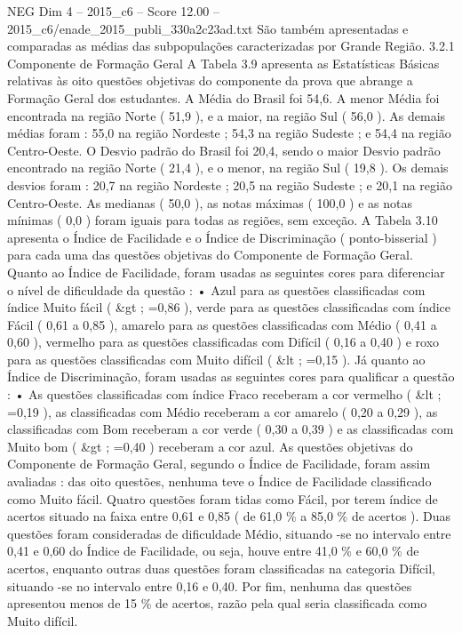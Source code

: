 \begin{textsample}{NEG Dim 4 – 2015\_c6 – Score 12.00 – 2015\_c6/enade\_2015\_publi\_330a2c23ad.txt}
São também apresentadas e comparadas as médias das subpopulações caracterizadas por Grande Região. 3.2.1 Componente de Formação Geral A Tabela 3.9 apresenta as Estatísticas Básicas relativas às oito questões objetivas do componente da prova que abrange a Formação Geral dos estudantes.
A Média do Brasil foi 54,6.
A menor Média foi encontrada na região Norte ( 51,9 ), e a maior, na região Sul ( 56,0 ).
As demais médias foram : 55,0 na região Nordeste ; 54,3 na região Sudeste ; e 54,4 na região Centro-Oeste.
O Desvio padrão do Brasil foi 20,4, sendo o maior Desvio padrão encontrado na região Norte ( 21,4 ), e o menor, na região Sul ( 19,8 ).
Os demais desvios foram : 20,7 na região Nordeste ; 20,5 na região Sudeste ; e 20,1 na região Centro-Oeste.
As medianas ( 50,0 ), as notas máximas ( 100,0 ) e as notas mínimas ( 0,0 ) foram iguais para todas as regiões, sem exceção.
A Tabela 3.10 apresenta o Índice de Facilidade e o Índice de Discriminação ( ponto-bisserial ) para cada uma das questões objetivas do Componente de Formação Geral.
Quanto ao Índice de Facilidade, foram usadas as seguintes cores para diferenciar o nível de dificuldade da questão : • Azul para as questões classificadas com índice Muito fácil ( \&gt ; =0,86 ), verde para as questões classificadas com índice Fácil ( 0,61 a 0,85 ), amarelo para as questões classificadas com Médio ( 0,41 a 0,60 ), vermelho para as questões classificadas com Difícil ( 0,16 a 0,40 ) e roxo para as questões classificadas com Muito difícil ( \&lt ; =0,15 ).
Já quanto ao Índice de Discriminação, foram usadas as seguintes cores para qualificar a questão : • As questões classificadas com índice Fraco receberam a cor vermelho ( \&lt ; =0,19 ), as classificadas com Médio receberam a cor amarelo ( 0,20 a 0,29 ), as classificadas com Bom receberam a cor verde ( 0,30 a 0,39 ) e as classificadas com Muito bom ( \&gt ; =0,40 ) receberam a cor azul.
As questões objetivas do Componente de Formação Geral, segundo o Índice de Facilidade, foram assim avaliadas : das oito questões, nenhuma teve o Índice de Facilidade classificado como Muito fácil.
Quatro questões foram tidas como Fácil, por terem índice de acertos situado na faixa entre 0,61 e 0,85 ( de 61,0 \% a 85,0 \% de acertos ).
Duas questões foram consideradas de dificuldade Médio, situando -se no intervalo entre 0,41 e 0,60 do Índice de Facilidade, ou seja, houve entre 41,0 \% e 60,0 \% de acertos, enquanto outras duas questões foram classificadas na categoria Difícil, situando -se no intervalo entre 0,16 e 0,40.
Por fim, nenhuma das questões apresentou menos de 15 \% de acertos, razão pela qual seria classificada como Muito difícil.

\end{textsample}
